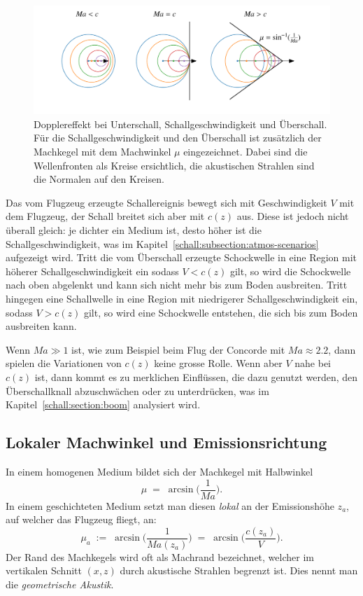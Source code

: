 \begin{figure}
    \centering
    \includegraphics[width=\textwidth]{papers/schall/figures/mach_doppler_triptych_offsets.pdf}
    \caption{Dopplereffekt bei Unterschall, Schallgeschwindigkeit und Überschall.
    Für die Schallgeschwindigkeit und den Überschall ist zusätzlich der
    Machkegel mit dem Machwinkel $\mu$ eingezeichnet. Dabei sind die
    Wellenfronten als Kreise ersichtlich, die akustischen Strahlen sind
    die Normalen auf den Kreisen.}
    \label{fig:schall:mach-zones}
\end{figure}
Das vom Flugzeug erzeugte Schallereignis bewegt sich mit Geschwindigkeit $V$
mit dem Flugzeug, der Schall breitet sich aber mit $c(z)$ aus.
Diese ist jedoch nicht überall gleich: je dichter ein Medium ist, desto
höher ist die Schallgeschwindigkeit, was im
Kapitel~\ref{schall:subsection:atmos-scenarios} aufgezeigt wird.
Tritt die vom Überschall erzeugte Schockwelle in eine Region mit höherer
Schallgeschwindigkeit ein sodass $V<c(z)$ gilt, so wird die Schockwelle
nach oben abgelenkt und kann sich nicht mehr bis zum Boden ausbreiten.
Tritt hingegen eine Schallwelle in eine Region mit niedrigerer
Schallgeschwindigkeit ein, sodass $V>c(z)$ gilt, so wird eine Schockwelle
entstehen, die sich bis zum Boden ausbreiten kann.

Wenn $Ma \gg 1$ ist, wie zum Beispiel beim Flug der Concorde mit $\textit{Ma} \approx 2.2$,
dann spielen die Variationen von $c(z)$ keine grosse Rolle.
Wenn aber $V$ nahe bei $c(z)$ ist, dann kommt es zu merklichen Einflüssen,
die dazu genutzt werden, den Überschallknall abzuschwächen oder zu
unterdrücken, was im Kapitel~\ref{schall:section:boom} analysiert wird.

\subsection{Lokaler Machwinkel und Emissionsrichtung}
\label{schall:lok-mach-emission}
In einem homogenen Medium bildet sich der Machkegel mit Halbwinkel
\begin{equation}
    \mu \;=\; \arcsin\!\Bigg(\frac{1}{\textit{Ma}}\Bigg).
\end{equation}
In einem geschichteten Medium setzt man diesen \emph{lokal} an der
Emissionshöhe $z_a$, auf welcher das Flugzeug fliegt, an:
\begin{equation}
    \mu_a \;:=\; \arcsin\!\Bigg(\frac{1}{\textit{Ma}(z_a)}\Bigg)
    \;=\; \arcsin\!\Bigg(\frac{c(z_a)}{V}\Bigg) .
    \label{eq:local-mach-angle}
\end{equation}
Der Rand des Machkegels wird oft als Machrand bezeichnet, welcher im
vertikalen Schnitt $(x,z)$ durch akustische Strahlen begrenzt ist.
Dies nennt man die \emph{geometrische Akustik}.

